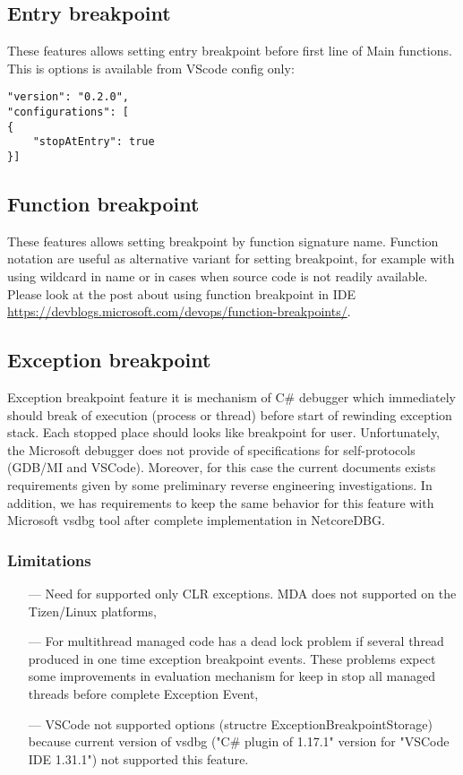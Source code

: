 \documentclass[a4paper,12pt]{article}
\newenvironment{nobr}{\begin{minipage}{\textwidth}\setlength\parskip{1em}
}{\end{minipage}\ignorespacesafterend}
\begin{document}
\subsection{Entry breakpoint}
These features allows setting entry breakpoint before first line of Main functions. This is options is available from VScode config only:
\begin{lstlisting}[style=cplusplus,numbers=none]
"version": "0.2.0",
"configurations": [
{
    "stopAtEntry": true
}]
\end{lstlisting}

\subsection{Function breakpoint}
These features allows setting breakpoint by function signature name. Function notation are useful as alternative variant for setting breakpoint, for example with using wildcard in name or in cases when source code is not readily available. Please look at the post about using function breakpoint in IDE \url{https://devblogs.microsoft.com/devops/function-breakpoints/}.

\subsection{Exception breakpoint}
Exception breakpoint feature it is mechanism of C\# debugger which immediately should break of execution (process or thread) before start of rewinding exception stack. Each stopped place should looks like breakpoint for user. Unfortunately, the Microsoft debugger does not provide of specifications for self-protocols (GDB/MI and VSCode). Moreover, for this case the current documents exists requirements given by some preliminary reverse engineering investigations. In addition, we has requirements to keep the same behavior for this feature with Microsoft vsdbg tool after complete implementation in NetcoreDBG.

\begin{nobr}
\subsubsection{Limitations}
\begin{itemize}
 \item[---] Need for supported only CLR exceptions. MDA does not supported on the Tizen/Linux platforms,
 \item[---] For multithread managed code has a dead lock problem if several thread produced in one time exception breakpoint events. These problems expect some improvements in evaluation mechanism for keep in stop all managed threads before complete Exception Event,
 \item[---] VSCode not supported options (structre ExceptionBreakpointStorage) because current version of vsdbg ("C\# plugin of 1.17.1" version for "VSCode IDE 1.31.1") not supported this feature.
\end{itemize}
\end{nobr}
\end{document}
